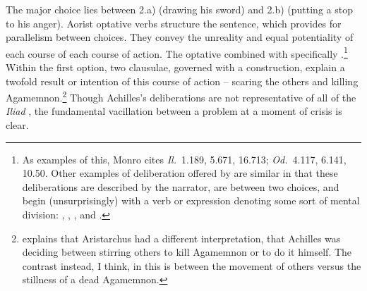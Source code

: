 \documentclass[12pt,letterpaper,oneside,final]{memoir}
\begin{document}
The major choice lies between 2.a) (drawing his sword) and 2.b) (putting a stop to his anger). Aorist optative verbs structure the sentence, which provides for parallelism between choices. They convey the unreality and equal potentiality of each course of each course of action. The optative combined with  specifically .\footnote{As \label{fthomdel} examples of this, Monro cites \emph{Il.}~1.189, 5.671, 16.713; \emph{Od.}~4.117, 6.141, 10.50.  Other examples of deliberation offered by \textcite[220]{monro1891} are similar in that these deliberations are described by the narrator, are between two choices, and begin (unsurprisingly) with a verb or expression denoting some sort of mental division: , , , and .} Within the first option, two clausulae, governed with a  construction, explain a twofold result or intention of this course of action -- scaring the others and killing Agamemnon.\footnote{\textcite[73]{hainsworth1993} explains that Aristarchus had a different interpretation, that Achilles was deciding between stirring others to kill Agamemnon or to do it himself. The contrast instead, I think, in this  is between the movement of others versus the stillness of a dead Agamemnon.} Though Achilles's deliberations are not representative of all of the \emph{Iliad} \parencite[23--26]{scully1984}, the fundamental vacillation between a problem at a moment of crisis is clear.
\end{document}
